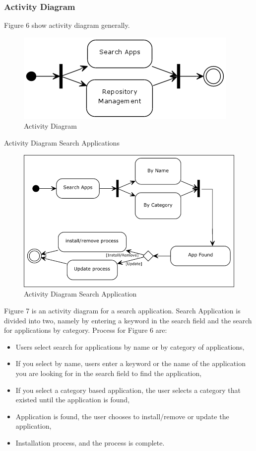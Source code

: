 \documentclass[conference, letterpaper]{IEEEtran}
\begin{document}
\subsubsection{Activity Diagram}
Figure 6 show activity diagram generally.

\begin{figure}[!t]
\centering
\includegraphics[scale=0.7]{image/ActivityDiagram.png}
\caption{Activity Diagram}
\end{figure}

Activity Diagram Search Applications

\begin{figure}[!t]
\centering
\includegraphics[scale=0.5]{image/ADSearchApp.png}
\caption{Activity Diagram Search Application}
\end{figure}

Figure 7 is an activity diagram for a search application. Search Application is divided into two, namely by entering a keyword in the search field and the search for applications by category. Process for Figure 6 are:
\begin{itemize}
\item Users select search for applications by name or by category of applications,
\item If you select by name, users enter a keyword or the name of the application you are looking for in the search field to find the application,
\item If you select a category based application, the user selects a category that existed until the application is found,
\item Application is found, the user chooses to install/remove or update the application,
\item Installation process, and the process is complete.
\end{itemize}
\end{document}
